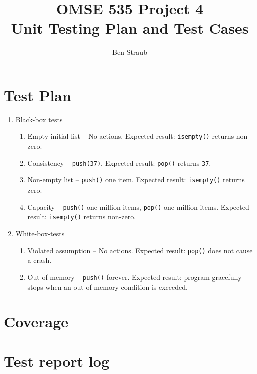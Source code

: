\documentclass[11pt]{article}
\begin{document}
\title{OMSE 535 Project 4 \\ Unit Testing Plan and Test Cases}
\author{Ben Straub}
\maketitle

\section{Test Plan}

\begin{enumerate}
\item Black-box tests
  \begin{enumerate}[{1}.1]
  \item Empty initial list -- No actions. Expected result: \texttt{isempty()} returns non-zero.
  \item Consistency -- \texttt{push(37)}.  Expected result: \texttt{pop()} returns \texttt{37}.
  \item Non-empty list -- \texttt{push()} one item.  Expected result: \texttt{isempty()} returns
    zero.
  \item Capacity -- \texttt{push()} one million items, \texttt{pop()} one million items. Expected
    result: \texttt{isempty()} returns non-zero.
  \end{enumerate}
\item White-box-tests
  \begin{enumerate}[{2}.1]
  \item Violated assumption -- No actions.  Expected result: \texttt{pop()} does not cause a crash.
  \item Out of memory -- \texttt{push()} forever.  Expected result: program gracefully stops when
    an out-of-memory condition is exceeded.
  \end{enumerate}
\end{enumerate}


\section{Coverage}

\section{Test report log}
\end{document}
